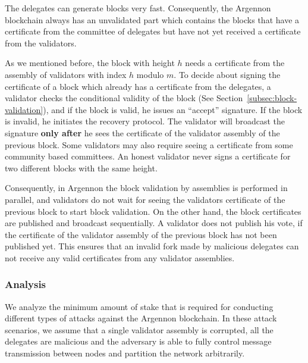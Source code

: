 The delegates can generate blocks very fast. Consequently, the Argennon blockchain always has an
unvalidated part which contains the blocks that have a certificate from the committee of delegates but have not
yet received a certificate from the validators.

As we mentioned before, the block with height $h$ needs a certificate from the assembly of
validators with index $h$ modulo $m$. To decide about signing the certificate of a block which already has
a certificate from the delegates, a validator checks the conditional
validity of the block (See Section~\ref{subsec:block-validation}), and if the block is valid, he issues
an ``accept'' signature. If the block is invalid, he initiates the recovery protocol. The validator will broadcast
the signature \textbf{only after} he sees the certificate of the validator assembly of the previous block.
Some validators may also require seeing a certificate from
some community based committees. An honest validator never signs a certificate for two different blocks with the
same height.

Consequently, in Argennon the block validation by assemblies is performed in parallel, and validators
do not wait for seeing the validators certificate of the previous block to start block validation. On the
other hand, the block certificates are published and broadcast sequentially. A validator does not publish his vote,
if the certificate of the validator assembly of the previous block has not been published yet. This ensures
that an invalid fork made by malicious delegates can not receive any valid certificates from any validator assemblies.

\subsubsection{Analysis}

We analyze the minimum amount of stake that is required for conducting different types of attacks against the Argennon
blockchain. In these attack scenarios, we assume that a single validator assembly is corrupted, all the delegates
are malicious and the adversary is able to fully control message transmission between nodes and partition the network
arbitrarily.

